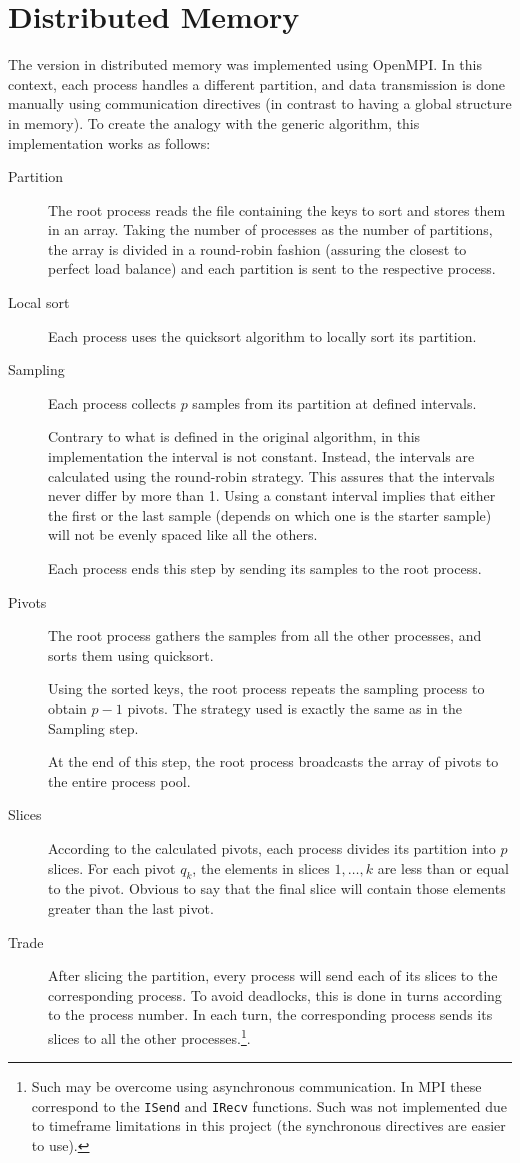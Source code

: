 \documentclass[abstract=on,9pt,twocolumn]{scrartcl}
\begin{document}
\section{Distributed Memory}
\label{sec:mpi}
The version in distributed memory was implemented using OpenMPI. In this context, each process handles a different partition, and data transmission is done manually using communication directives (in contrast to having a global structure in memory). To create the analogy with the generic algorithm, this implementation works as follows:
\begin{description}
	\item[Partition]{The root process reads the file containing the keys to sort and stores them in an array. Taking the number of processes as the number of partitions, the array is divided in a round-robin fashion (assuring the closest to perfect load balance) and each partition is sent to the respective process.}
	\item[Local sort]{Each process uses the quicksort algorithm to locally sort its partition.}
	\item[Sampling]{Each process collects $p$ samples from its partition at defined intervals. 
	
	Contrary to what is defined in the original algorithm, in this implementation the interval is not constant. Instead, the intervals are calculated using the round-robin strategy. This assures that the intervals never differ by more than 1. Using a constant interval implies that either the first or the last sample (depends on which one is the starter sample) will not be evenly spaced like all the others.
	
	Each process ends this step by sending its samples to the root process.}
	\item[Pivots]{The root process gathers the samples from all the other processes, and sorts them using quicksort.
	
	Using the sorted keys, the root process repeats the sampling process to obtain $p-1$ pivots. The strategy used is exactly the same as in the Sampling step.
	
	At the end of this step, the root process broadcasts the array of pivots to the entire process pool.}
	\item[Slices]{According to the calculated pivots, each process divides its partition into $p$ slices. For each pivot $q_{k}$, the elements in slices $1,\ldots,k$ are less than or equal to the pivot. Obvious to say that the final slice will contain those elements greater than the last pivot.}
	\item[Trade]{After slicing the partition, every process will send each of its slices to the corresponding process. To avoid deadlocks, this is done in turns according to the process number. In each turn, the corresponding process sends its slices to all the other processes.\footnote{Such may be overcome using asynchronous communication. In MPI these correspond to the \texttt{ISend} and \texttt{IRecv} functions. Such was not implemented due to timeframe limitations in this project (the synchronous directives are easier to use).}.
	
}
\end{description}
\end{document}
